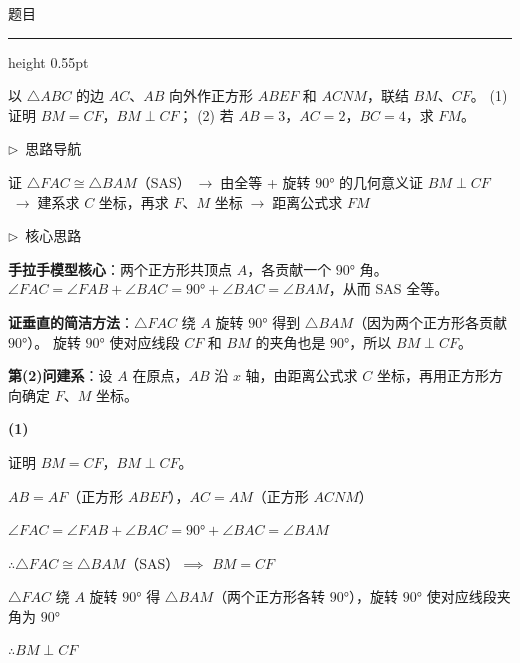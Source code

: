 \documentclass{exam-zh}
\newcommand{\edukai}{\kaishu}
\newenvironment{eduSubQuestionItem}[1]{%
  \needspace{4\baselineskip}%
  \vspace{2mm}
  \par\noindent
  \hangindent=8mm\hangafter=1
  {\color{edu-blue}\bfseries #1}\enspace
  \begingroup
  \color{edu-ink}
}{%
  \endgroup
  \par
  \vspace{3mm}
}
\newenvironment{eduAuxItem}[1]{%
  \needspace{4\baselineskip}%
  \vspace{2mm}
  \par\noindent
  \hangindent=8mm\hangafter=1
  {\color{edu-blue}\edukai $\triangleright$~#1}\enspace
  \begingroup
  \color{edu-ink}
  \edukai
}{%
  \endgroup
  \par
  \vspace{4mm}
}
\newenvironment{eduProblemBlock}[1][题目]{%
  \needspace{8\baselineskip}
  {\small\color{edu-muted}#1}\par
  \vspace{1.5mm}
  {\color{edu-blue}\hrule height 0.55pt}
  \vspace{4.5mm}
  \begingroup
  \color{edu-ink}
  \large
  \setlength{\parskip}{2.2mm}
  \linespread{1.20}\selectfont
}{%
  \par
  \endgroup
  \vspace{6mm}
}
\begin{document}
\begin{eduProblemBlock}[题目]
以 $\triangle ABC$ 的边 $AC$、$AB$ 向外作正方形 $ABEF$ 和 $ACNM$，联结 $BM$、$CF$。
(1) 证明 $BM = CF$，$BM \perp CF$；
(2) 若 $AB = 3$，$AC = 2$，$BC = 4$，求 $FM$。

\end{eduProblemBlock}









\begin{eduAuxItem}{思路导航}
证 $\triangle FAC \cong \triangle BAM$（SAS）$\;\to\;$由全等 + 旋转 $90°$ 的几何意义证 $BM \perp CF$$\;\to\;$建系求 $C$ 坐标，再求 $F$、$M$ 坐标$\;\to\;$距离公式求 $FM$\end{eduAuxItem}




\begin{eduAuxItem}{核心思路}
\textbf{手拉手模型核心}：两个正方形共顶点 $A$，各贡献一个 $90°$ 角。
$\angle FAC = \angle FAB + \angle BAC = 90° + \angle BAC = \angle BAM$，从而 SAS 全等。

\textbf{证垂直的简洁方法}：$\triangle FAC$ 绕 $A$ 旋转 $90°$ 得到 $\triangle BAM$（因为两个正方形各贡献 $90°$）。
旋转 $90°$ 使对应线段 $CF$ 和 $BM$ 的夹角也是 $90°$，所以 $BM \perp CF$。

\textbf{第(2)问建系}：设 $A$ 在原点，$AB$ 沿 $x$ 轴，由距离公式求 $C$ 坐标，再用正方形方向确定 $F$、$M$ 坐标。
\end{eduAuxItem}




\begin{eduSubQuestionItem}{(1)}
证明 $BM = CF$，$BM \perp CF$。\end{eduSubQuestionItem}

\begingroup
\setlength{\parskip}{2.5mm}
$AB = AF$（正方形 $ABEF$），$AC = AM$（正方形 $ACNM$）\par
$\angle FAC = \angle FAB + \angle BAC = 90° + \angle BAC = \angle BAM$\par
$\therefore \triangle FAC \cong \triangle BAM$（SAS）$\implies$ $BM = CF$\par
$\triangle FAC$ 绕 $A$ 旋转 $90°$ 得 $\triangle BAM$（两个正方形各转 $90°$），旋转 $90°$ 使对应线段夹角为 $90°$\par
$\therefore BM \perp CF$\par
\endgroup
\end{document}
